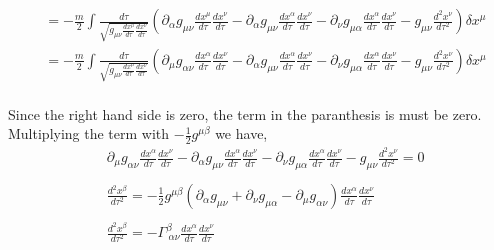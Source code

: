 \begin{equation}
\begin{split}
&= -\frac{m}{2}\int \frac{d\tau}{\sqrt{g_{\mu\nu}\frac{dx^{\mu}}{d\tau}\frac{dx^{\nu}}{d\tau}}}\left(\partial_{\alpha}g_{\mu\nu}\frac{dx^{\mu}}{d\tau}\frac{dx^{\nu}}{d\tau} - \partial_{\alpha}g_{\mu\nu}\frac{dx^{\alpha}}{d\tau}\frac{dx^{\nu}}{d\tau} - \partial_{\nu}g_{\mu\alpha}\frac{dx^{\alpha}}{d\tau}\frac{dx^{\nu}}{d\tau} - g_{\mu\nu}\frac{d^{2}x^{\nu}}{d\tau^{2}}\right)\delta x^{\mu}\\
&= -\frac{m}{2}\int \frac{d\tau}{\sqrt{g_{\mu\nu}\frac{dx^{\mu}}{d\tau}\frac{dx^{\nu}}{d\tau}}}\left(\partial_{\mu}g_{\alpha\nu}\frac{dx^{\alpha}}{d\tau}\frac{dx^{\nu}}{d\tau} - \partial_{\alpha}g_{\mu\nu}\frac{dx^{\alpha}}{d\tau}\frac{dx^{\nu}}{d\tau} - \partial_{\nu}g_{\mu\alpha}\frac{dx^{\alpha}}{d\tau}\frac{dx^{\nu}}{d\tau} - g_{\mu\nu}\frac{d^{2}x^{\nu}}{d\tau^{2}}\right)\delta x^{\mu}\\
\end{split}
\end{equation}

Since the right hand side is zero, the term in the paranthesis is must be zero. Multiplying the term with $-\frac{1}{2}g^{\mu\beta}$ we have,
\begin{equation}
\begin{split}
&\partial_{\mu}g_{\alpha\nu}\frac{dx^{\alpha}}{d\tau}\frac{dx^{\nu}}{d\tau} - \partial_{\alpha}g_{\mu\nu}\frac{dx^{\alpha}}{d\tau}\frac{dx^{\nu}}{d\tau} - \partial_{\nu}g_{\mu\alpha}\frac{dx^{\alpha}}{d\tau}\frac{dx^{\nu}}{d\tau} - g_{\mu\nu}\frac{d^{2}x^{\nu}}{d\tau^{2}} = 0\\\\
&\frac{d^{2}x^{\beta}}{d\tau^{2}} = -\frac{1}{2}g^{\mu\beta}\left(\partial_{\alpha}g_{\mu\nu} + \partial_{\nu}g_{\mu\alpha} - \partial_{\mu}g_{\alpha\nu}\right)\frac{dx^{\alpha}}{d\tau}\frac{dx^{\nu}}{d\tau}\\\\
& \frac{d^{2}x^{\beta}}{d\tau^{2}} = -\Gamma^{\beta}_{\ \alpha\nu}\frac{dx^{\alpha}}{d\tau}\frac{dx^{\nu}}{d\tau}
\end{split}
\end{equation}